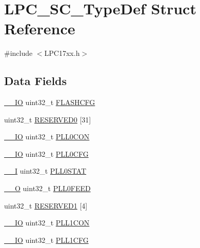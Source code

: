 \hypertarget{structLPC__SC__TypeDef}{}\section{L\+P\+C\+\_\+\+S\+C\+\_\+\+Type\+Def Struct Reference}
\label{structLPC__SC__TypeDef}


{\ttfamily \#include $<$L\+P\+C17xx.\+h$>$}

\subsection*{Data Fields}
\begin{DoxyCompactItemize}
\item 
\hyperlink{LPC17xx_8h_aec43007d9998a0a0e01faede4133d6be}{\+\_\+\+\_\+\+IO} uint32\+\_\+t \hyperlink{structLPC__SC__TypeDef_ad7b9da8772f01f3ecca6abd97625a80f}{F\+L\+A\+S\+H\+C\+FG}
\item 
uint32\+\_\+t \hyperlink{structLPC__SC__TypeDef_a8e0fd99318a2d51748f6546c40e7b563}{R\+E\+S\+E\+R\+V\+E\+D0} \mbox{[}31\mbox{]}
\item 
\hyperlink{LPC17xx_8h_aec43007d9998a0a0e01faede4133d6be}{\+\_\+\+\_\+\+IO} uint32\+\_\+t \hyperlink{structLPC__SC__TypeDef_ae75e4960a5e1d70b912d93a3d9dd3193}{P\+L\+L0\+C\+ON}
\item 
\hyperlink{LPC17xx_8h_aec43007d9998a0a0e01faede4133d6be}{\+\_\+\+\_\+\+IO} uint32\+\_\+t \hyperlink{structLPC__SC__TypeDef_a8793cd1c3649849b126253e8567c9138}{P\+L\+L0\+C\+FG}
\item 
\hyperlink{LPC17xx_8h_af63697ed9952cc71e1225efe205f6cd3}{\+\_\+\+\_\+I} uint32\+\_\+t \hyperlink{structLPC__SC__TypeDef_a93ce12cb449f3c327553dbab596c9bc5}{P\+L\+L0\+S\+T\+AT}
\item 
\hyperlink{LPC17xx_8h_a7e25d9380f9ef903923964322e71f2f6}{\+\_\+\+\_\+O} uint32\+\_\+t \hyperlink{structLPC__SC__TypeDef_acdafef0cdd425361238c459db34dd810}{P\+L\+L0\+F\+E\+ED}
\item 
uint32\+\_\+t \hyperlink{structLPC__SC__TypeDef_a142c9c410f0776ac5a9cefe1d5e9ee82}{R\+E\+S\+E\+R\+V\+E\+D1} \mbox{[}4\mbox{]}
\item 
\hyperlink{LPC17xx_8h_aec43007d9998a0a0e01faede4133d6be}{\+\_\+\+\_\+\+IO} uint32\+\_\+t \hyperlink{structLPC__SC__TypeDef_aeadf4a0049ea8f39ad5144146385fe32}{P\+L\+L1\+C\+ON}
\item 
\hyperlink{LPC17xx_8h_aec43007d9998a0a0e01faede4133d6be}{\+\_\+\+\_\+\+IO} uint32\+\_\+t \hyperlink{structLPC__SC__TypeDef_a12e98febef8928ec39fe5963eb8c1509}{P\+L\+L1\+C\+FG}

\end{DoxyCompactItemize}
